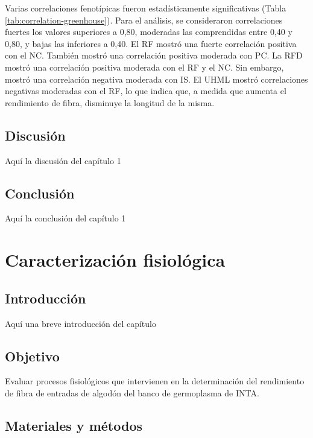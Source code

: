 \documentclass[12pt,oneside]{reedthesis}
\begin{document}
Varias correlaciones fenotípicas fueron estadísticamente significativas (Tabla \ref{tab:correlation-greenhouse}). Para el análisis, se consideraron correlaciones fuertes los valores superiores a 0,80, moderadas las comprendidas entre 0,40 y 0,80, y bajas las inferiores a 0,40. El RF mostró una fuerte correlación positiva con el NC. También mostró una correlación positiva moderada con PC. La RFD mostró una correlación positiva moderada con el RF y el NC. Sin embargo, mostró una correlación negativa moderada con IS. El UHML mostró correlaciones negativas moderadas con el RF, lo que indica que, a medida que aumenta el rendimiento de fibra, disminuye la longitud de la misma.

\section{Discusión}\label{discusiuxf3n}

Aquí la discusión del capítulo 1

\section{Conclusión}\label{conclusiuxf3n}

Aquí la conclusión del capítulo 1

\chapter{Caracterización fisiológica}\label{math-sci}

\section{Introducción}\label{introducciuxf3n-2}

Aquí una breve introducción del capítulo

\section{Objetivo}\label{objetivo-1}

Evaluar procesos fisiológicos que intervienen en la determinación del rendimiento de fibra de entradas de algodón del banco de germoplasma de INTA.

\section{Materiales y métodos}\label{materiales-y-muxe9todos-1}
\end{document}
